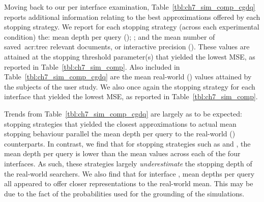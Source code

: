 Moving back to our per interface examination, Table~\ref{tbl:ch7_sim_comp_cgdq} reports additional information relating to the best approximations offered by each stopping strategy. We report for each stopping strategy (across each experimental condition) the: mean depth per query (); ; and the mean number of saved~\gls{acr:trec} relevant documents, or interactive precision (). These values are attained at the stopping threshold parameter(s) that yielded the lowest MSE, as reported in Table~\ref{tbl:ch7_sim_comp}. Also included in Table~\ref{tbl:ch7_sim_comp_cgdq} are the mean real-world () values attained by the subjects of the user study. We also once again  the stopping strategy for each interface that yielded the lowest MSE, as reported in Table~\ref{tbl:ch7_sim_comp}.

Trends from Table~\ref{tbl:ch7_sim_comp_cgdq} are largely as to be expected: stopping strategies that yielded the closest approximations to actual mean stopping behaviour parallel the mean depth per query to the real-world () counterparts. In contrast, we find that for stopping strategies such as  and , the mean depth per query is lower than the mean values across each of the four interfaces. As such, these strategies largely \emph{underestimate} the stopping depth of the real-world searchers. We also find that for interface , mean depths per query all appeared to offer closer representations to the real-world mean. This may be due to the fact of the probabilities used for the grounding of the simulations.

